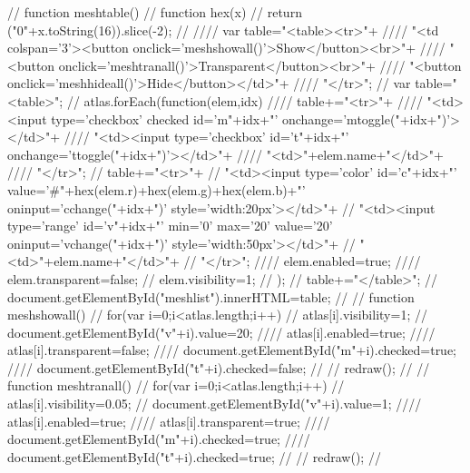 //            function meshtable(){
//                function hex(x){
//                    return ("0"+x.toString(16)).slice(-2);
//                }
////                var table="<table><tr>"+
////                        "<td colspan='3'><button onclick='meshshowall()'>Show</button><br>"+
////                        "<button onclick='meshtranall()'>Transparent</button><br>"+
////                        "<button onclick='meshhideall()'>Hide</button></td>"+
////                        "</tr>";
//                var table="<table>";
//                atlas.forEach(function(elem,idx){
////                    table+="<tr>"+
////                            "<td><input type='checkbox' checked id='m"+idx+"' onchange='mtoggle("+idx+")'></td>"+
////                            "<td><input type='checkbox' id='t"+idx+"' onchange='ttoggle("+idx+")'></td>"+
////                            "<td>"+elem.name+"</td>"+
////                            "</tr>";
//                    table+="<tr>"+
//                            "<td><input type='color' id='c"+idx+"' value='#"+hex(elem.r)+hex(elem.g)+hex(elem.b)+"' oninput='cchange("+idx+")' style='width:20px'></td>"+
//                            "<td><input type='range' id='v"+idx+"' min='0' max='20' value='20' oninput='vchange("+idx+")' style='width:50px'></td>"+
//                            "<td>"+elem.name+"</td>"+
//                            "</tr>";
////                    elem.enabled=true;
////                    elem.transparent=false;
//                    elem.visibility=1;
//                });
//                table+="</table>";
//                document.getElementById("meshlist").innerHTML=table;
//            }
//            function meshshowall(){
//                for(var i=0;i<atlas.length;i++){
//                    atlas[i].visibility=1;
//                    document.getElementById("v"+i).value=20;
////                    atlas[i].enabled=true;
////                    atlas[i].transparent=false;
////                    document.getElementById("m"+i).checked=true;
////                    document.getElementById("t"+i).checked=false;
//                }
//                redraw();
//            }
//            function meshtranall(){
//                for(var i=0;i<atlas.length;i++){
//                    atlas[i].visibility=0.05;
//                    document.getElementById("v"+i).value=1;
////                    atlas[i].enabled=true;
////                    atlas[i].transparent=true;
////                    document.getElementById("m"+i).checked=true;
////                    document.getElementById("t"+i).checked=true;
//                }
//                redraw();
//            }
